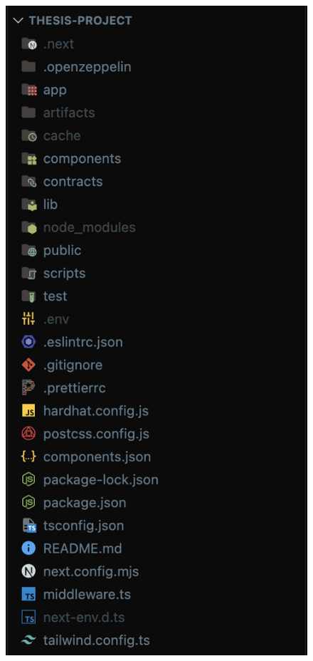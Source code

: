 \begin{figure}[htbp]
   \centering
   \begin{minipage}[ht]{0.4\textwidth}
       \centering
       \includegraphics[scale=0.25]{src/images/folder-structure.png}

\end{minipage}
\end{figure}
